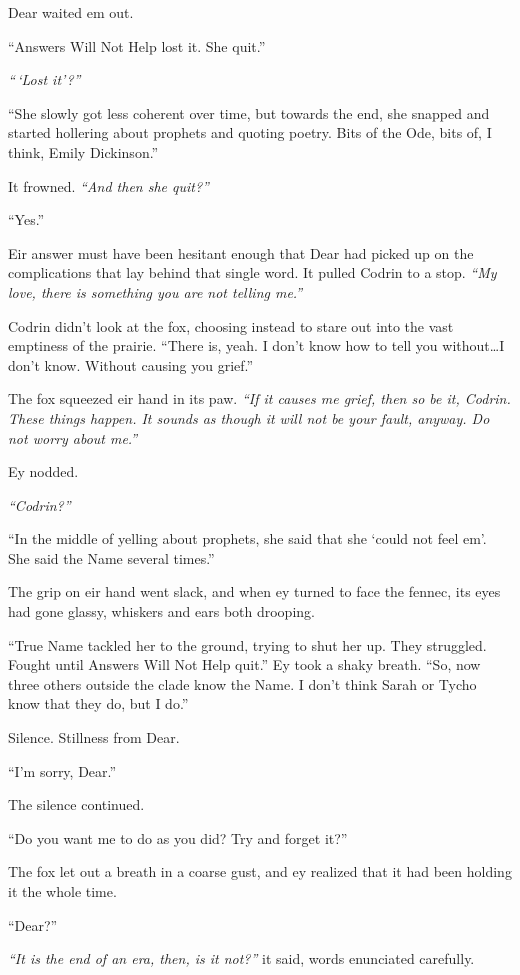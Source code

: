 Dear waited em out.

``Answers Will Not Help lost it. She quit.''

\emph{``\,`Lost it'?''}

``She slowly got less coherent over time, but towards the end, she snapped and started hollering about prophets and quoting poetry. Bits of the Ode, bits of, I think, Emily Dickinson.''

It frowned. \emph{``And then she quit?''}

``Yes.''

Eir answer must have been hesitant enough that Dear had picked up on the complications that lay behind that single word. It pulled Codrin to a stop. \emph{``My love, there is something you are not telling me.''}

Codrin didn't look at the fox, choosing instead to stare out into the vast emptiness of the prairie. ``There is, yeah. I don't know how to tell you without\ldots I don't know. Without causing you grief.''

The fox squeezed eir hand in its paw. \emph{``If it causes me grief, then so be it, Codrin. These things happen. It sounds as though it will not be your fault, anyway. Do not worry about me.''}

Ey nodded.

\emph{``Codrin?''}

``In the middle of yelling about prophets, she said that she `could not feel em'. She said the Name several times.''

The grip on eir hand went slack, and when ey turned to face the fennec, its eyes had gone glassy, whiskers and ears both drooping.

``True Name tackled her to the ground, trying to shut her up. They struggled. Fought until Answers Will Not Help quit.'' Ey took a shaky breath. ``So, now three others outside the clade know the Name. I don't think Sarah or Tycho know that they do, but I do.''

Silence. Stillness from Dear.

``I'm sorry, Dear.''

The silence continued.

``Do you want me to do as you did? Try and forget it?''

The fox let out a breath in a coarse gust, and ey realized that it had been holding it the whole time.

``Dear?''

\emph{``It is the end of an era, then, is it not?''} it said, words enunciated carefully.


